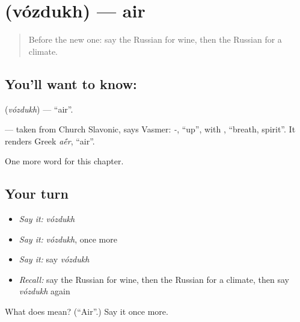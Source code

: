 \section[\texorpdfstring{\ru{воздух} (vózdukh)}{воздух (vózdukh)}]{ (vózdukh) — air}

\label{lesson:RU-C164-vozdukh}



\begin{quote}
Before the new one: say the Russian for wine, then the Russian for a climate.
\end{quote}

\subsection*{You'll want to know: }
\textbf{} (\emph{vózdukh}) — \textquotedblleft{}air\textquotedblright{}.

\begin{cousinweb}
\textbf{} — taken from Church Slavonic, says Vasmer: \emph{-}, \textquotedblleft{}up\textquotedblright{}, with \emph{}, \textquotedblleft{}breath, spirit\textquotedblright{}. It renders Greek \emph{a\'{\={e}}r}, \textquotedblleft{}air\textquotedblright{}.
\end{cousinweb}

\begin{grammarlens}[title={What you've built}]
One more word for this chapter.
\end{grammarlens}

\subsection*{Your turn}
\begin{itemize}
\raggedright
  \item \emph{Say it:} \emph{vózdukh}
  \item \emph{Say it:} \emph{vózdukh}, once more
  \item \emph{Say it:} say \emph{vózdukh}
  \item \emph{Recall:} say the Russian for wine, then the Russian for a climate, then say \emph{vózdukh} again
\end{itemize}

\begin{tcolorbox}[breakable,colback=teal!4,colframe=teal!35!black,title={Before you move on}]
What does  mean? (\textquotedblleft{}Air\textquotedblright{}.) Say it once more.
\end{tcolorbox}
